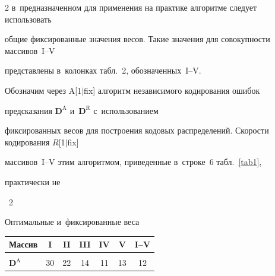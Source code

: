 \begin{multicols}{2}
в~предназначенном для применения на практике алгоритме следует использовать 

общие фиксированные значения весов. Такие значения для совокупности массивов~I--V 

представлены в~колонках табл.~2, обозначенных~\mbox{I--V}.



Обозначим через A[1$\vert$fix] алгоритм независимого кодирования ошибок 

предсказания $\mathbf{D}^\text{A}$ и~$\mathbf{D}^\text{R}$ с~использованием 

фиксированных весов для построения кодовых распределений. Скорости кодирования $R$[1$\vert$fix] 

массивов~I--V этим алгоритмом, приведенные в~строке~6 табл.~\ref{tab1}, 

практически не\linebreak\vspace*{-12pt}










\begin{center}



{{\tablename~2}\ \ \small{

Оптимальные и~фиксированные веса

}}




\vspace{2ex}



{\small \tabcolsep=7.5pt

\begin{tabular}{|l|ccccc|c|}

\hline

\multicolumn{1}{|c|}{Массив}& I     & II    

& III   & IV    & V     & I--V  \\

\hline

&&&&&&\\[-9pt]

\hspace*{3mm}$\mathbf{D}^\text{A}$       &30 &22 &14 &11 &13 &12 \\


\end{tabular}}
\end{center}
\end{multicols}
